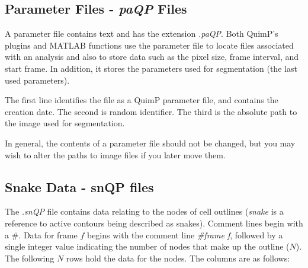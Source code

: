 \documentclass[a4paper,12pt]{article}
\begin{document}
  
\subsection{Parameter Files - \textit{paQP} Files}
\label{paQP}

A parameter file contains text and has the extension \textit{.paQP}.  Both QuimP's plugins and
MATLAB functions use the parameter file to locate files associated with an analysis and also to store data such as the
pixel size, frame interval, and start frame.  In addition, it stores the parameters used for segmentation
(the last used parameters).

The first line identifies the file as a QuimP parameter file, and contains the creation date.
The second is random identifier.
The third is the absolute path to the image used for segmentation.
 
In general, the contents of a parameter file should not be changed, but you may wish to alter the paths to
image files if you later move them.
 

\subsection{Snake Data - snQP files}
\label{snQP}

The \textit{.snQP} file contains data relating to the nodes of cell outlines (\textit{snake} is a reference to active contours being 
described as snakes).   Comment lines
begin with a \#.  Data for frame $f$ begins with the comment line \textit{\#frame f}, followed by a single integer value
indicating the number of nodes that make up the outline ($N$).  The following $N$ rows hold the data for the nodes. The 
columns are as follows:
\end{document}
